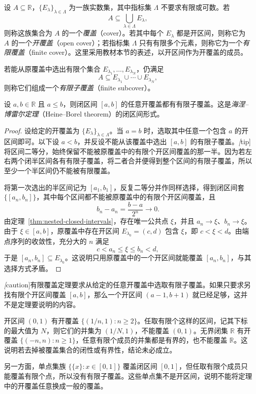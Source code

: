 \documentclass[UTF8,12pt,a4paper,fontset=fandol]{ctexbook}
\begin{document}
\begin{definition}
\label{def:open-cover-and-finite-subcover}
设 $A\subseteq\mathbb{R}$，$\{E_\lambda\}_{\lambda\in\Lambda}$ 为一族实数集，其中指标集 $\Lambda$ 不要求有限或可数。若
\[
    A\subseteq\bigcup_{\lambda\in\Lambda}E_\lambda,
\]
则称这族集合为 $A$ 的一个\emph{覆盖}（cover）。若其中每个 $E_\lambda$ 都是开区间，则称它为 $A$ 的一个\emph{开覆盖}（open cover）；若指标集 $\Lambda$ 只有有限多个元素，则称它为一个\emph{有限覆盖}（finite cover）。这里采用教材本节的表述，以开区间作为开覆盖的成员。

若能从原覆盖中选出有限个集合 $E_{\lambda_1},\ldots,E_{\lambda_N}$，仍满足
\[
    A\subseteq E_{\lambda_1}\cup\cdots\cup E_{\lambda_N},
\]
则称它们组成一个\emph{有限子覆盖}（finite subcover）。
\end{definition}

\begin{theorem}[有限覆盖定理]
\label{thm:finite-covering}
设 $a,b\in\mathbb{R}$ 且 $a\leq b$，则闭区间 $[a,b]$ 的任意开覆盖都有有限子覆盖。这是\emph{海涅--博雷尔定理}（Heine--Borel theorem）的闭区间形式。
\end{theorem}

\begin{proof}
设给定的开覆盖为 $\{E_\lambda\}_{\lambda\in\Lambda}$。当 $a=b$ 时，选取其中任意一个包含 $a$ 的开区间即可。以下设 $a<b$，并反设不能从该覆盖中选出 $[a,b]$ 的有限子覆盖。\emph[tip]{将区间二等分，始终保留不能被原覆盖中的有限个开区间覆盖的那一半。}因为若左右两个闭半区间各有有限子覆盖，将二者合并便得到整个区间的有限子覆盖，所以至少一个半区间仍不能被有限覆盖。

将第一次选出的半区间记为 $[a_1,b_1]$，反复二等分并作同样选择，得到闭区间套 $\{[a_n,b_n]\}$，其中每个区间都不能被原覆盖中的有限个开区间覆盖，且
\[
    b_n-a_n=\frac{b-a}{2^n}\longrightarrow0.
\]
由定理~\ref{thm:nested-closed-intervals}，存在唯一公共点 $\xi$，并且 $a_n\to\xi$、$b_n\to\xi$。由于 $\xi\in[a,b]$，原覆盖中存在开区间 $E_{\lambda_0}=(c,d)$ 包含 $\xi$，即 $c<\xi<d$。由端点序列的收敛性，充分大的 $n$ 满足
\[
    c<a_n\leq\xi\leq b_n<d,
\]
于是 $[a_n,b_n]\subseteq E_{\lambda_0}$。这说明只用原覆盖中的一个开区间就能覆盖 $[a_n,b_n]$，与其选择方式矛盾。
\end{proof}

\begin{remark}
\emph[caution]{有限覆盖定理要求从给定的任意开覆盖中选取有限子覆盖。}如果只要求另找有限个开区间覆盖 $[a,b]$，那么一个开区间 $(a-1,b+1)$ 就已经足够，这并不是定理要说明的内容。

开区间 $(0,1)$ 有开覆盖 $\{(1/n,1):n\geq2\}$。任取有限个这样的区间，记其下标的最大值为 $N$，则它们的并集为 $(1/N,1)$，不能覆盖 $(0,1)$。无界闭集 $\mathbb{R}$ 有开覆盖 $\{(-n,n):n\geq1\}$，任意有限个成员的并集都是有界的，也不能覆盖 $\mathbb{R}$。这说明若去掉被覆盖集合的闭性或有界性，结论未必成立。

另一方面，单点集族 $\{\{x\}:x\in[0,1]\}$ 覆盖闭区间 $[0,1]$，但任取有限个成员只能覆盖有限个点，所以没有有限子覆盖。这些单点集不是开区间，说明不能将定理中的开覆盖任意换成一般的覆盖。
\end{remark}
\end{document}
